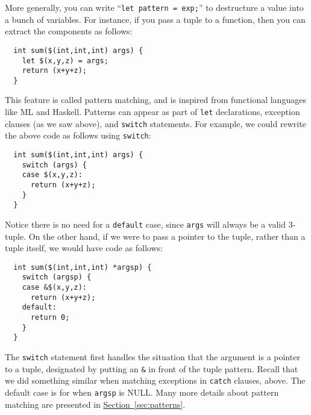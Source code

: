 More generally, you can write ``\texttt{let pattern = exp;}'' to
destructure a value into a bunch of variables.  For instance, if you
pass a tuple to a function, then you can extract the components as
follows:
\begin{verbatim}
  int sum($(int,int,int) args) {
    let $(x,y,z) = args;
    return (x+y+z);
  }
\end{verbatim}
This feature is called pattern matching, and is inspired from
functional languages like ML and Haskell.  Patterns can appear as part
of \texttt{let} declarations, exception clauses (as we saw above), and
\texttt{switch} statements.  For example, we could rewrite the above
code as follows using \texttt{switch}:
\begin{verbatim}
  int sum($(int,int,int) args) {
    switch (args) {
    case $(x,y,z):
      return (x+y+z);
    }
  }
\end{verbatim}
Notice there is no need for a \texttt{default} case, since
\texttt{args} will always be a valid 3-tuple.  On the other hand, if
we were to pass a pointer to the tuple, rather than a tuple itself, we
would have code as follows:
\begin{verbatim}
  int sum($(int,int,int) *argsp) {
    switch (argsp) {
    case &$(x,y,z):
      return (x+y+z);
    default:
      return 0;
    }
  }
\end{verbatim}
The \texttt{switch} statement first handles the situation that the
argument is a pointer to a tuple, designated by putting an \texttt{\&}
in front of the tuple pattern.  Recall that we did something similar
when matching exceptions in \texttt{catch} clauses, above.  The
default case is for when \texttt{argsp} is NULL.  Many more details
about pattern matching are presented in
\hyperref[{sec:patterns}]{Section~\ref{sec:patterns}}.

